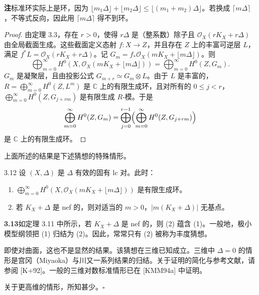 \par\medskip\noindent\textbf{注}\quad 标准环实际上是环，因为 $\lfloor m_1\Delta\rfloor+\lfloor m_2\Delta\rfloor\leq\lfloor(m_1+m_2)\Delta\rfloor$。若换成 $\lceil m\Delta\rceil$，不等式反向，因此用 $\lceil m\Delta\rceil$ 得不到环。\par\medskip

\begin{proof}
由定理 3.3，存在 $r>0$，使得 $r\Delta$ 是（整系数）除子且 $\mathcal{O}_X(rK_X+r\Delta)$ 由全局截面生成。这些截面定义态射 $f:X\to Z$，并且存在 $Z$ 上的丰富可逆层 $L$，满足 $f^*L=\mathcal{O}_X(rK_X+r\Delta)$。记 $G_m=f_*\mathcal{O}_X(mK_X+\lfloor m\Delta\rfloor)$。则
\[
\bigoplus_{m=0}^{\infty}H^0(X,\mathcal{O}_X(mK_X+\lfloor m\Delta\rfloor))
=\bigoplus_{m=0}^{\infty}H^0(Z,G_m).
\]
$G_m$ 是凝聚层，且由投影公式 $G_{m+r}\simeq G_m\otimes L$。由于 $L$ 是丰富的，$R=\bigoplus_{m=0}^{\infty}H^0(Z,L^m)$ 是 $\mathbb{C}$ 上的有限生成环，且对所有的 $0\leq j<r$，$\bigoplus_{m=0}^{\infty}H^0(Z,G_{j+rm})$ 是有限生成 $R$-模。于是
\[
\bigoplus_{m=0}^{\infty}H^0(Z,G_m)
=\bigoplus_{j=0}^{r-1}\Bigl(\bigoplus_{m=0}^{\infty}H^0(Z,G_{j+rm})\Bigr)
\]
是 $\mathbb{C}$ 上的有限生成环。
\end{proof}

上面所述的结果是下述猜想的特殊情形。

\begin{conjecture*}[丰度猜想]{3.12}
设 $(X,\Delta)$ 是 $\Delta$ 有效的固有 lc 对。此时：
\begin{enumerate}[label=(\arabic*),leftmargin=2.4em,itemsep=2pt,topsep=2pt,parsep=0pt]
\item $\bigoplus_{m=0}^{\infty}H^0(X,\mathcal{O}_X(mK_X+\lfloor m\Delta\rfloor))$ 是有限生成环。
\item 若 $K_X+\Delta$ 是 nef 的，则对适当的 $m>0$，$|m(K_X+\Delta)|$ 无基点。
\end{enumerate}
\end{conjecture*}

\par\medskip\noindent\textbf{3.13}\quad 如定理 3.11 中所示，若 $K_X+\Delta$ 是 nef 的，则 (2) 蕴含 (1)。一般地，极小模型纲领把 (1) 归结为 (2)。因此，常常只有 (2) 被称为丰度猜想。\par
即使对曲面，这也不是显然的结果。该猜想在三维已知成立。三维中 $\Delta=0$ 的情形是宫冈（Miyaoka）与川又一系列结果的归结。关于证明的简化与参考文献，请参阅 [K+92]。一般的三维对数标准情形已在 [KMM94a] 中证明。\par
关于更高维的情形，所知甚少。\hfill$\square$\par\medskip

